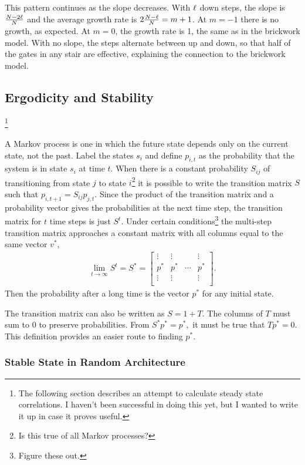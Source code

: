 This pattern continues as the slope decreases. With $\ell$ down steps, the slope is $\frac{N-2\ell}{N}$ and the average growth rate is $2\frac{N-\ell}{N} = m+1$. At $m = -1$ there is no growth, as expected. At $m=0$, the growth rate is 1, the same as in the brickwork model. With no slope, the steps alternate between up and down, so that half of the gates in any stair are effective, explaining the connection to the brickwork model.

\subsection{Ergodicity and Stability}\footnote{The following section describes an attempt to calculate steady state correlations. I haven't been successful in doing this yet, but I wanted to write it up in case it proves useful.} \label{sub:erg}

A Markov process is one in which the future state depends only on the current state, not the past. Label the states $s_i$ and define $p_{i,t}$ as the probability that the system is in state $s_i$ at time $t$. When there is a constant probability $S_{ij}$ of transitioning from state $j$ to state $i$\footnote{Is this true of all Markov processes?} it is possible to write the transition matrix $S$ such that $p_{i,t+1}= S_{ij}p_{j,t}$. Since the product of the transition matrix and a probability vector gives the probabilities at the next time step, the transition matrix for $t$ time steps is just $S^t$. Under certain conditions\footnote{Figure these out.} the multi-step transition matrix approaches a constant matrix with all columns equal to the same vector $v^*$,
\begin{align}
\lim\limits_{t\to \infty}S^t = S^* = \begin{bmatrix}
\vdots & \vdots &  & \vdots\\
p^* & p^* & \cdots & p^*\\
\vdots & \vdots &  & \vdots\\
\end{bmatrix}.
\end{align}
Then the probability after a long time is the vector $p^*$ for any initial state.

The transition matrix can also be written as $S = 1+T$. The columns of $T$ must sum to 0 to preserve probabilities. From $S^*p^* = p^*,$ it must be true that $Tp^*=0$. This definition provides an easier route to finding $p^*$.

\subsubsection{Stable State in Random Architecture}  \label{subsub:randstate}

